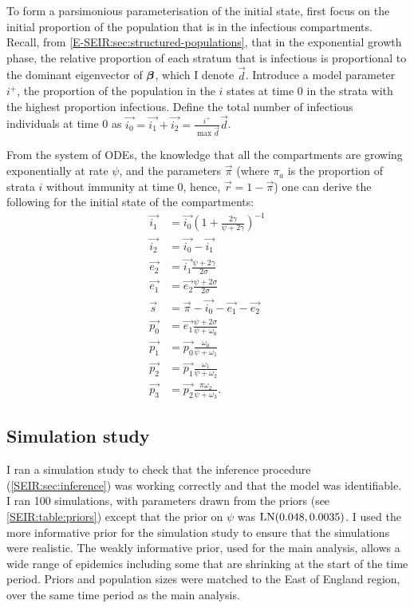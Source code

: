 \documentclass[thesis.tex]{subfiles}
\begin{document}
To form a parsimonious parameterisation of the initial state, first focus on the initial proportion of the population that is in the infectious compartments.
Recall, from \cref{E-SEIR:sec:structured-populations}, that in the exponential growth phase, the relative proportion of each stratum that is infectious is proportional to the dominant eigenvector of $\bm{\beta}$, which I denote $\vec{d}$.
Introduce a model parameter $i^+$, the proportion of the population in the $i$ states at time 0 in the strata with the highest proportion infectious.
Define the total number of infectious individuals at time 0 as $\vec{i_0} = \vec{i_1} + \vec{i_2} = \frac{i^+}{\max \vec{d}} \vec{d}$.

From the system of ODEs, the knowledge that all the compartments are growing exponentially at rate $\psi$, and the parameters $\vec{\pi}$ (where $\pi_a$ is the proportion of strata $i$ without immunity at time 0, hence, $\vec{r} = 1 - \vec{\pi}$) one can derive the following for the initial state of the compartments:
\begin{align}
    \vec{i_1} &= \vec{i_0} \left(1 + \frac{2\gamma}{\psi + 2\gamma} \right)^{-1} \\
    \vec{i_2} &= \vec{i_0} - \vec{i_1} \\
    \vec{e_2} &= \vec{i_1} \frac{\psi + 2\gamma}{2\sigma} \\
    \vec{e_1} &= \vec{e_2} \frac{\psi + 2\sigma}{2\sigma} \\
    \vec{s} &= \vec{\pi} - \vec{i_0} - \vec{e_1} - \vec{e_2} \\
    \vec{p_0} &= \vec{e_1} \frac{\psi + 2\sigma}{\psi + \omega_0} \\
    \vec{p_1} &= \vec{p_0} \frac{\omega_0}{\psi + \omega_1} \\
    \vec{p_2} &= \vec{p_1} \frac{\omega_1}{\psi + \omega_{2}} \\
    \vec{p_3} &= \vec{p_2} \frac{\pi \omega_{2}}{\psi + \omega_{3}}.
\end{align}

\subsection{Simulation study} \label{SEIR:sec:sim-study}

I ran a simulation study to check that the inference procedure (\cref{SEIR:sec:inference}) was working correctly and that the model was identifiable.
I ran 100 simulations, with parameters drawn from the priors (see \cref{SEIR:table:priors}) except that the prior on $\psi$ was $\operatorname{LN}(0.048, 0.0035)$.
I used the more informative prior for the simulation study to ensure that the simulations were realistic.
The weakly informative prior, used for the main analysis, allows a wide range of epidemics including some that are shrinking at the start of the time period.
Priors and population sizes were matched to the East of England region, over the same time period as the main analysis.
\end{document}
